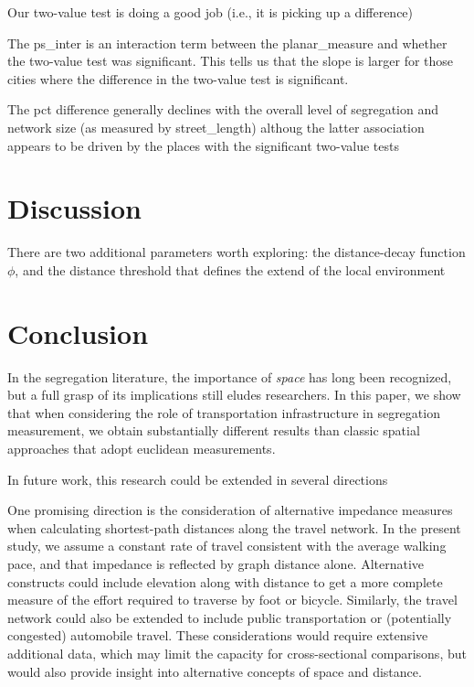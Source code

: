 \documentclass[
  10pt,
]{article}
\begin{document}
Our two-value test is doing a good job (i.e., it is picking up a
difference)

The ps\_inter is an interaction term between the planar\_measure and
whether the two-value test was significant. This tells us that the slope
is larger for those cities where the difference in the two-value test is
significant.

The pct difference generally declines with the overall level of
segregation and network size (as measured by street\_length) althoug the
latter association appears to be driven by the places with the
significant two-value tests

\hypertarget{discussion}{%
\section{Discussion}\label{discussion}}

There are two additional parameters worth exploring: the distance-decay
function \(\phi\), and the distance threshold that defines the extend of
the local environment

\hypertarget{conclusion}{%
\section{Conclusion}\label{conclusion}}

In the segregation literature, the importance of \emph{space} has long
been recognized, but a full grasp of its implications still eludes
researchers. In this paper, we show that when considering the role of
transportation infrastructure in segregation measurement, we obtain
substantially different results than classic spatial approaches that
adopt euclidean measurements.

In future work, this research could be extended in several directions

One promising direction is the consideration of alternative impedance
measures when calculating shortest-path distances along the travel
network. In the present study, we assume a constant rate of travel
consistent with the average walking pace, and that impedance is
reflected by graph distance alone. Alternative constructs could include
elevation along with distance to get a more complete measure of the
effort required to traverse by foot or bicycle. Similarly, the travel
network could also be extended to include public transportation or
(potentially congested) automobile travel. These considerations would
require extensive additional data, which may limit the capacity for
cross-sectional comparisons, but would also provide insight into
alternative concepts of space and distance.
\end{document}

